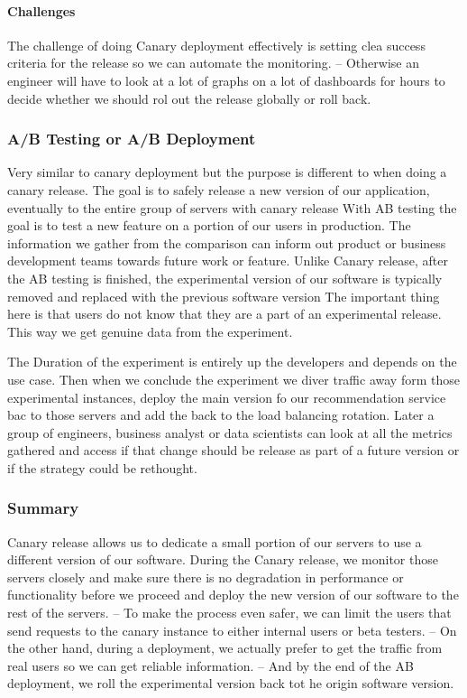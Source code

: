 \paragraph{Challenges}
The challenge of doing Canary deployment effectively is setting clea success criteria for the release so we can automate the monitoring.
-- Otherwise an engineer will have to look at a lot of graphs on a lot of dashboards for hours to decide whether we should rol out the release globally or roll back.

\subsubsection{A/B Testing or A/B Deployment}
Very similar to canary deployment but the purpose is different to when doing a canary release.
The goal is to safely release a new version of our application, eventually to the entire group of servers with canary release
With AB testing the goal is to test a new feature on a portion of our users in production.
The information we gather from the comparison can inform out product or business development teams towards future work or feature.
Unlike Canary release, after the AB testing is finished, the experimental version of our software is typically removed and replaced with the previous software version
The important thing here is that users do not know that they are a part of an experimental release.
This way we get genuine data from the experiment.

The Duration of the experiment is entirely up the developers and depends on the use case.
Then when we conclude the experiment we diver traffic away form those experimental instances, deploy the main version fo our recommendation service bac to those servers and add the back to the load balancing rotation.
Later a group of engineers, business analyst or data scientists can look at all the metrics gathered and access if that change should be release as part of a future version or if the strategy could be rethought.

\subsubsection{Summary}
Canary release allows us to dedicate a small portion of our servers to use a different version of our software.
During the Canary release, we monitor those servers closely and make sure there is no degradation in performance or functionality before we proceed and deploy the new version of our software to the rest of the servers.
-- To make the process even safer, we can limit the users that send requests to the canary instance to either internal users or beta testers.
-- On the other hand, during a  deployment, we actually prefer to get the traffic from real users so we can get reliable information.
-- And by the end of the AB deployment, we roll the experimental version back tot he origin software version.

